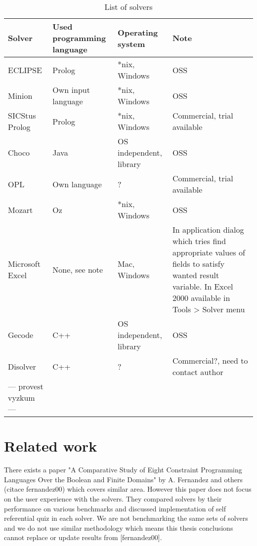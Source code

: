 \begin{table}[ht]
\caption{\label{list-solvers}List of solvers}
\begin{center}
\begin{tabular}{|l|l|l|l|}
\hline Solver &	Used programming language &	Operating system &	Note \\
\hline ECLIPSE &	Prolog & *nix, Windows & OSS \\
\hline Minion & Own input language & *nix, Windows & OSS \\
\hline SICStus Prolog & Prolog & *nix, Windows & Commercial, trial available \\
\hline Choco &	Java & OS independent, library & OSS \\
\hline OPL &	Own language & ?	&	Commercial, trial available \\
\hline Mozart &	Oz &	*nix, Windows &	OSS \\
\hline Microsoft Excel &	None, see note &	Mac, Windows &	In application dialog which tries find  appropriate values of fields to satisfy wanted result variable. In Excel 2000 available in Tools > Solver menu \\
\hline Gecode &	C++ &	OS independent, library &	OSS \\
\hline Disolver &	C++ &	? &	Commercial?, need to contact author \\
\hline --- provest vyzkum ---	& & & \\
\hline
\end{tabular}
\end{center}
\end{table}

\section{Related work}
There exists a paper "A Comparative Study of Eight Constraint Programming Languages Over the Boolean and Finite Domains" by A. Fernandez and others (citace fernandez00) which covers similar area. However this paper does not focus on the user experience with the solvers. They compared solvers by their performance on various benchmarks and discussed implementation of self referential quiz in each solver. We are not benchmarking the same sets of solvers and we do not use similar methodology which means this thesis conclusions cannot replace or update results from [fernandez00].
		

